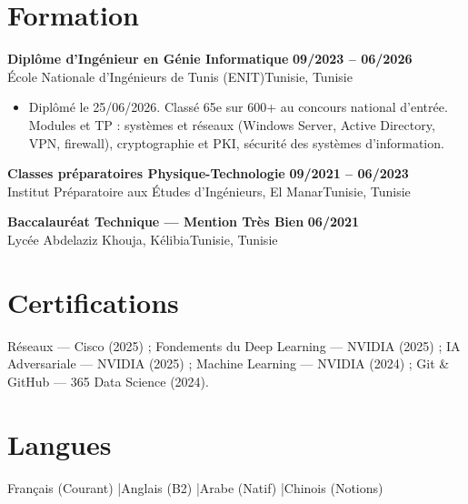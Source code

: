 \documentclass[a4paper,9pt]{article}
\newcommand{\cventry}[4]{\textbf{#1} \hfill \textbf{#4}\\[0.2pt]#2{\ifx\relax#3\relax\else, #3\fi}\par\vspace{0.3pt}}
\begin{document}
\section{Formation}
\cventry{Diplôme d'Ingénieur en Génie Informatique}{École Nationale d'Ingénieurs de Tunis (ENIT)}{Tunisie}{09/2023 -- 06/2026}
\begin{itemize}
  \item Diplômé le 25/06/2026. Classé 65e sur 600+ au concours national d'entrée. Modules et TP : systèmes et réseaux (Windows Server, Active Directory, VPN, firewall), cryptographie et PKI, sécurité des systèmes d'information.
\end{itemize}
\cventry{Classes préparatoires Physique-Technologie}{Institut Préparatoire aux Études d'Ingénieurs, El Manar}{Tunisie}{09/2021 -- 06/2023}
\cventry{Baccalauréat Technique --- Mention Très Bien}{Lycée Abdelaziz Khouja, Kélibia}{Tunisie}{06/2021}
\section{Certifications}
Réseaux --- Cisco (2025) ; Fondements du Deep Learning --- NVIDIA (2025) ; IA Adversariale --- NVIDIA (2025) ; Machine Learning --- NVIDIA (2024) ; Git \& GitHub --- 365 Data Science (2024).
\section{Langues}
Français (Courant) \quad|\quad Anglais (B2) \quad|\quad Arabe (Natif) \quad|\quad Chinois (Notions)
\end{document}
